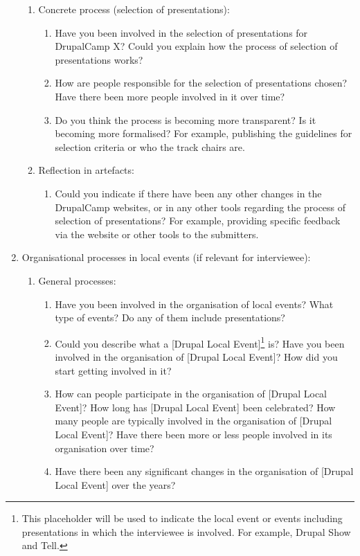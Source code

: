 \begin{enumerate}
\begin{enumerate}
			\item Concrete process (selection of presentations):
			\begin{enumerate}		
			\item Have you been involved in the selection of presentations for DrupalCamp X?  Could you explain how the process of selection of presentations works? 
			\item How are people responsible for the selection of presentations chosen? Have there been more people involved in it over time?
			\item Do you think the process is becoming more transparent? Is it becoming more formalised? For example, publishing the guidelines for selection criteria or who the track chairs are.
			\end{enumerate}	

			\item Reflection in artefacts:
			\begin{enumerate}				
				\item Could you indicate if there have been any other changes in the DrupalCamp websites, or in any other tools regarding the process of selection of presentations? For example, providing specific feedback via the website or other tools to the submitters.
			\end{enumerate}			
		\end{enumerate}
		
		
	\item Organisational processes in local events (if relevant for interviewee):
		\begin{enumerate}
			\item General processes:
			\begin{enumerate}		
				\item Have you been involved in the organisation of local events? What type of events? Do any of them include presentations?
				\item Could you describe what a [Drupal Local Event]\footnote{This placeholder will be used to indicate the local event or events including presentations in which the interviewee is involved. For example, Drupal Show and Tell.} is? Have you been involved in the organisation of [Drupal Local Event]? How did you start getting involved in it?
				\item How can people participate in the organisation of [Drupal Local Event]? How long has [Drupal Local Event] been celebrated? How many people are typically involved in the organisation of [Drupal Local Event]? Have there been more or less people involved in its organisation over time?
				\item Have there been any significant changes in the organisation of [Drupal Local Event] over the years?
			\end{enumerate}


\end{enumerate}
\end{enumerate}
